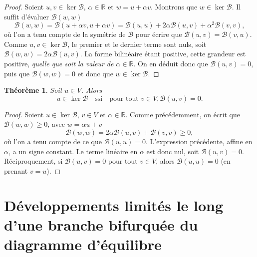 \documentclass[12pt, final]{amsart}
\newtheorem{theorem}{Théorème}
\begin{document}
\begin{proof}
  Soient $u, v \in \ker \mathcal{B}$, $\alpha \in \mathbb{R}$ et $w = u +
  \alpha v$. Montrons que $w \in \ker \mathcal{B}$. Il suffit d'{\'e}valuer
  $\mathcal{B} (w, w)$
  \begin{equation}
    \mathcal{B} (w, w) =\mathcal{B} (u + \alpha v, u + \alpha v) =\mathcal{B}
    (u, u) + 2 \alpha \mathcal{B} (u, v) + \alpha^2 \mathcal{B} (v, v),
  \end{equation}
  o{\`u} l'on a tenu compte de la sym{\'e}trie de $\mathcal{B}$ pour
  {\'e}crire que $\mathcal{B} (u, v) =\mathcal{B} (v, u)$. Comme $u, v \in
  \ker \mathcal{B}$, le premier et le dernier terme sont nuls, soit
  $\mathcal{B} (w, w) = 2 \alpha \mathcal{B} (u, v)$. La forme bilin{\'e}aire
  {\'e}tant positive, cette grandeur est positive, \emph{quelle que soit la
  valeur de $\alpha \in \mathbb{R}$}. On en d{\'e}duit donc que $\mathcal{B}
  (u, v) = 0$, puis que $\mathcal{B} (w, w) = 0$ et donc que $w \in \ker
  \mathcal{B}.$
\end{proof}

\begin{theorem}
  Soit $u \in V$. Alors
  \begin{equation}
    u \in \ker \mathcal{B} \quad \text{ssi} \quad \text{pour tout } v \in V,
    \mathcal{B} (u, v) = 0.
  \end{equation}
\end{theorem}

\begin{proof}
  Soient $u \in \ker \mathcal{B}$, $v \in V$ et $\alpha \in \mathbb{R}$. Comme
  pr{\'e}c{\'e}demment, on {\'e}crit que $\mathcal{B} (w, w) \geq 0$, avec $w
  = \alpha u + v$
  \begin{equation}
    \mathcal{B} (w, w) = 2 \alpha \mathcal{B} (u, v) +\mathcal{B} (v, v) \geq
    0,
  \end{equation}
  o{\`u} l'on a tenu compte de ce que $\mathcal{B} (u, u) = 0$. L'expression
  pr{\'e}c{\'e}dente, affine en $\alpha$, a un signe constant. Le terme
  lin{\'e}aire en $\alpha$ est donc nul, soit $\mathcal{B} (u, v) = 0$.
  R{\'e}ciproquement, si $\mathcal{B} (u, v) = 0$ pour tout $v \in V$, alors
  $\mathcal{B} (u, u) = 0$ (en prenant $v = u$).
\end{proof}

\section{D{\'e}veloppements limit{\'e}s le long d'une branche bifurqu{\'e}e du
diagramme d'{\'e}quilibre}
\end{document}

